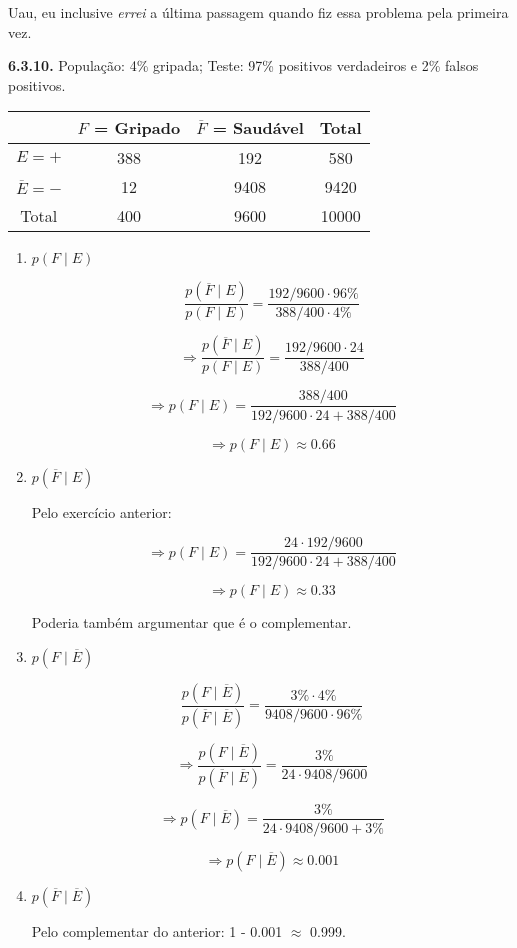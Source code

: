 \documentclass{article}
\begin{document}
Uau, eu inclusive \textit{errei} a última passagem quando fiz essa problema pela primeira vez.

\textbf{6.3.10.} População: 4\% gripada; Teste: 97\% positivos verdadeiros e 2\% falsos positivos.

\begin{center}
    \begin{tabular}{c | c  c | c} 
        & \( F \) = Gripado & \( \overline{F} \) = Saudável & Total \\ [0.5ex]
        \hline
        \( E = + \) & 388 & 192 & 580 \\ 
        \hline
        \( \overline{E} = - \) & 12 & 9408 & 9420 \\ 
        \hline
        Total & 400 & 9600 & 10000 \\ [0.8ex]
    \end{tabular}
\end{center}

\begin{enumerate}

    \item \( p(F \mid E) \)

        \[ \frac{p(\overline{F} \mid E)}{p(F \mid E)} = \frac{192/9600 \cdot 96\%}{388/400 \cdot 4\%} \] 

        \[ \Rightarrow \frac{p(\overline{F} \mid E)}{p(F \mid E)} = \frac{192/9600 \cdot 24}{388/400} \] 

        \[ \Rightarrow {p(F \mid E)} = \frac{388/400}{192/9600 \cdot 24 + 388/400} \] 

        \[ \Rightarrow {p(F \mid E)} \approx 0.66\] 

    \item \( p(\overline{F} \mid E) \)

        Pelo exercício anterior:

        \[ \Rightarrow {p(F \mid E)} = \frac{ 24 \cdot 192/9600}{192/9600 \cdot 24 + 388/400} \] 

        \[ \Rightarrow {p(F \mid E)} \approx 0.33\] 

        Poderia também argumentar que é o complementar.

    \item \( p (F \mid \overline{E}) \)

        \[ \frac{p(F \mid \overline{E})}{p(\overline{F}  \mid \overline{E} )} = \frac{3\% \cdot 4\%}{9408/9600 \cdot 96\%} \] 

        \[ \Rightarrow \frac{p(F \mid \overline{E} )}{p(\overline{F} \mid \overline{E})} = \frac{3\%}{24 \cdot 9408/9600} \] 

        \[ \Rightarrow {p(F \mid \overline{E} )} = \frac{3\%}{24 \cdot 9408/9600 + 3\%} \] 

        \[ \Rightarrow {p(F \mid \overline{E} )} \approx 0.001\] 

    \item \( p (\overline{F}  \mid \overline{E}) \)

        Pelo complementar do anterior: 1 - 0.001 \( \approx \) 0.999.

\end{enumerate}
\end{document}
